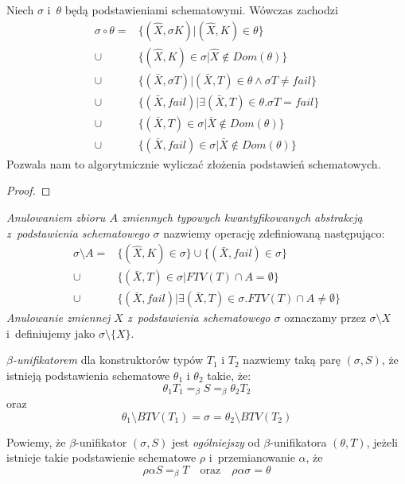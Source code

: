 \documentclass[11pt,leqno]{article}
\begin{document}
\begin{lemat}
Niech $\sigma$ i~$\theta$ będą podstawieniami schematowymi. Wówczas zachodzi
\begin{align*}
\sigma \circ \theta = & \{ (\widehat{X}, \sigma K) | (\widehat{X}, K) \in \theta \} \\
\cup & \{ (\widehat{X}, K) \in \sigma | \widehat{X} \notin Dom(\theta) \} \\
\cup & \{ (\bar{X}, \sigma T) | (\bar{X}, T) \in \theta \land \sigma T \neq fail \} \\
\cup & \{ (\bar{X}, fail) | \exists (\bar{X}, T) \in \theta . \sigma T = fail \} \\
\cup & \{ (\bar{X}, T) \in \sigma | \bar{X} \notin Dom(\theta) \} \\
\cup & \{ (\bar{X}, fail) \in \sigma | \bar{X} \notin Dom(\theta) \}
\end{align*}
Pozwala nam to algorytmicznie wyliczać złożenia podstawień schematowych.
\end{lemat}
\begin{proof}
\end{proof}

\begin{definicja}
\emph{Anulowaniem zbioru $A$ zmiennych typowych kwantyfikowanych abstrakcją z~podstawienia schematowego $\sigma$} nazwiemy operację
zdefiniowaną następująco:
\begin{align*}
\sigma \setminus A = & \{ (\widehat{X}, K) \in \sigma \} \cup \{ (\bar{X}, fail) \in \sigma \} \\
\cup & \{ (\bar{X}, T) \in \sigma | FTV(T) \cap A = \emptyset \} \\
\cup & \{ (\bar{X}, fail) | \exists (\bar{X}, T) \in \sigma . FTV(T) \cap A \neq \emptyset \}
\end{align*}
\emph{Anulowanie zmiennej $X$ z~podstawienia schematowego $\sigma$} oznaczamy przez $\sigma \setminus X$ i~definiujemy jako $\sigma \setminus \{X\}$.
\end{definicja}

\begin{definicja}
\emph{$\beta$-unifikatorem} dla konstruktorów typów $T_1$ i $T_2$ nazwiemy taką parę $(\sigma, S)$, że istnieją
podstawienia schematowe $\theta_1$ i $\theta_2$ takie, że:
\[
\theta_1 T_1 =_\beta S =_\beta \theta_2 T_2
\]
oraz
\[
\theta_1 \setminus BTV(T_1) = \sigma = \theta_2 \setminus BTV(T_2)
\]
\end{definicja}

\begin{definicja}
Powiemy, że $\beta$-unifikator $(\sigma, S)$ jest \emph{ogólniejszy} od $\beta$-unifikatora
$(\theta, T)$, jeżeli istnieje takie podstawienie schematowe $\rho$ i~przemianowanie $\alpha$, że
\[
\rho\alpha S =_\beta T \quad \textrm{oraz} \quad \rho\alpha\sigma = \theta
\]
\end{definicja}
\end{document}
